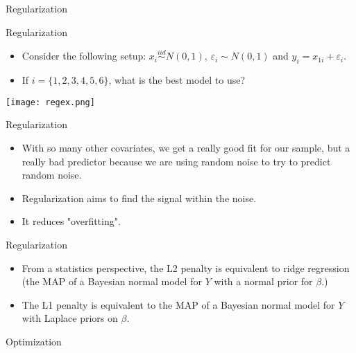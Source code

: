 \documentclass{beamer} %
\begin{document}
\begin{frame}
  \begin{center}
    {\Large Regularization}
  \end{center}
\end{frame}

\begin{frame}{Regularization}
  \begin{minipage}{0.6\textwidth}
  \begin{itemize}
    \item Consider the following setup: $x_{i} \stackrel{iid}{\sim} N(0, 1)$,
      $\varepsilon_i \sim N(0, 1)$ and $y_i = x_{1i} + \varepsilon_i$.
    \item If $i = \{1, 2, 3, 4, 5, 6\}$, what is the best model to use?
  \end{itemize}
\end{minipage}
\begin{minipage}{0.35\textwidth}
  \texttt{[image: regex.png]}
\end{minipage}
\end{frame}

\begin{frame}{Regularization}
  \begin{itemize}
    \item With so many other covariates, we get a really good fit for our
      sample, but a really bad predictor because we are using random noise to
      try to predict random noise.
    \item Regularization aims to find the signal within the noise.
    \item It reduces "overfitting".
  \end{itemize}
\end{frame}

\begin{frame}{Regularization}
  \begin{itemize}
    \item From a statistics perspective, the L2 penalty is equivalent to ridge
      regression (the MAP of a  Bayesian normal model for $Y$ with a normal prior for $\beta$.)
    \item The L1 penalty is equivalent to the MAP of a Bayesian normal model for $Y$ with Laplace priors on $\beta$.
  \end{itemize}
\end{frame}

\begin{frame}
  \begin{center}
    {\Large Optimization}
  \end{center}
\end{frame}
\end{document}
